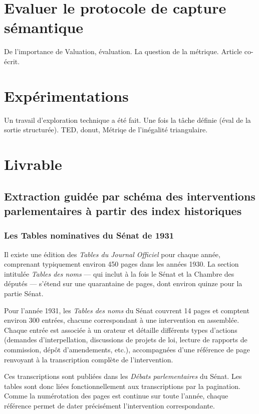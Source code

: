 \chapter{Evaluer le protocole de capture sémantique}

De l'importance de Valuation, évaluation. La question de la métrique. Article co-écrit.

\chapter{Expérimentations}

Un travail d'exploration technique a été fait. Une fois la tâche définie (éval de la sortie structurée).
TED, donut, Métriqe de l'inégalité triangulaire.

\chapter{Livrable}

\section{Extraction guidée par schéma des interventions parlementaires à partir des index historiques}

\subsection{Les Tables nominatives du Sénat de 1931}

Il existe une édition des \emph{Tables du Journal Officiel} pour chaque année, comprenant typiquement environ 450 pages dans les années 1930. La section intitulée \emph{Tables des noms} — qui inclut à la fois le Sénat et la Chambre des députés — s’étend sur une quarantaine de pages, dont environ quinze pour la partie Sénat.

Pour l’année 1931, les \emph{Tables des noms} du Sénat couvrent 14 pages et comptent environ 300 entrées, chacune correspondant à une intervention en assemblée. Chaque entrée est associée à un orateur et détaille différents types d’actions (demandes d’interpellation, discussions de projets de loi, lecture de rapports de commission, dépôt d’amendements, etc.), accompagnées d’une référence de page renvoyant à la transcription complète de l’intervention.

Ces transcriptions sont publiées dans les \emph{Débats parlementaires} du Sénat. Les tables sont donc liées fonctionnellement aux transcriptions par la pagination. Comme la numérotation des pages est continue sur toute l’année, chaque référence permet de dater précisément l’intervention correspondante.

